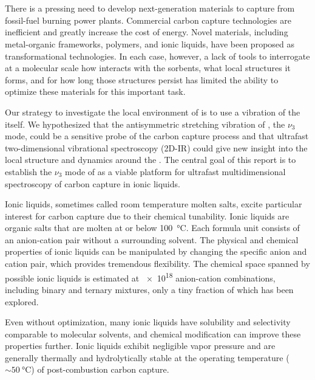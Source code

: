 \section{\texorpdfstring{}{Introduction}}
\label{sec:anions_intro}
There is a pressing need to develop next-generation materials to capture  from fossil-fuel burning power plants. Commercial carbon capture technologies are inefficient and greatly increase the cost of energy\cite{Bhown2011}. Novel materials, including metal-organic frameworks,\cite{millwardJACS-05,sumidaCR-12} polymers,\cite{Du2011,Dawson2011} and ionic liquids,\cite{batesJACS-02,Karadas2010,baraACR-10} have been proposed as transformational technologies. In each case, however, a lack of tools to interrogate at a molecular scale how  interacts with the sorbents, what local structures it forms, and for how long those structures persist has limited the ability to optimize these materials for this important task.

Our strategy to investigate the local environment of  is to use a vibration of the  itself. We hypothesized that the antisymmetric stretching vibration of , the \(\nu_3\) mode, could be a sensitive probe of the carbon capture process and that ultrafast two-dimensional vibrational spectroscopy (2D-IR) could give new insight into the local structure and dynamics around the . The central goal of this report is to establish the \(\nu_3\) mode of  as a viable platform for ultrafast multidimensional spectroscopy of carbon capture in ionic liquids.

Ionic liquids, sometimes called room temperature molten salts, excite particular interest for carbon capture due to their chemical tunability. Ionic liquids are organic salts that are molten at or below \SI{100}{\celsius}. Each formula unit consists of an anion-cation pair without a surrounding solvent. The physical and chemical properties of ionic liquids can be manipulated by changing the specific anion and cation pair, which provides tremendous flexibility. The chemical space spanned by possible ionic liquids is estimated at \num{e18} anion-cation combinations, including binary and ternary mixtures,\cite{Holbrey1999} only a tiny fraction of which has been explored.

Even without optimization, many ionic liquids have  solubility and selectivity comparable to molecular solvents,\cite{Bara2009,Cadena2004} and chemical modification can improve these properties further.\cite{Gurkan2010,seoJPCB-14} Ionic liquids exhibit negligible vapor pressure and are generally thermally and hydrolytically stable at the operating temperature (\(\sim \SI{50}{\celsius}\)) of post-combustion carbon capture.

